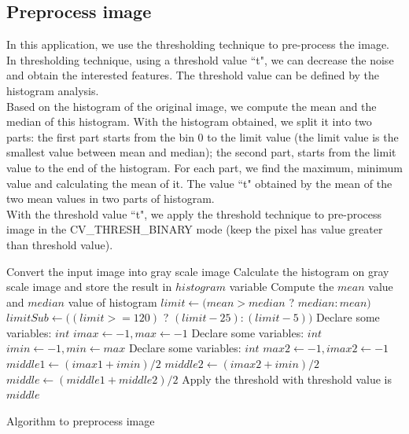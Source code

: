 \subsection{Preprocess image}
In this application, we use the thresholding technique to pre-process the image. In thresholding technique, using a threshold value ``t", we can decrease the noise and obtain the interested features. The threshold value can be defined by the histogram analysis.\\[0.2cm]
Based on the histogram of the original image, we compute the mean and the median of this histogram. With the histogram obtained, we split it into two parts: the first part starts from the bin 0 to the limit value (the limit value is the smallest value between mean and median); the second part, starts from the limit value to the end of the histogram. For each part, we find the maximum, minimum value and calculating the mean of it. The value ``t" obtained by the mean of the two mean values in two parts of histogram.\\
With the threshold value ``t", we apply the threshold technique to pre-process image in the CV\_THRESH\_BINARY mode (keep the pixel has value greater than threshold value).\\
\IncMargin{1em}
\begin{algorithm}[H]
\Indm 
{}
\Indp
Convert the input image into gray scale image\;
Calculate the histogram on gray scale image and store the result in $histogram$ variable \;
Compute the $mean$ value and $median$ value of histogram\;
$limit \leftarrow (mean > median$ ? $median : mean)$\;
$limitSub \leftarrow ((limit >= 120)$ ? $(limit - 25) : (limit - 5))$\;
Declare some variables: $int$ $imax \leftarrow -1, max \leftarrow -1$\;
Declare some variables: $int$ $imin \leftarrow -1, min \leftarrow max$\;
Declare some variables: $int$ $max2 \leftarrow -1, imax2 \leftarrow -1$\;
$middle1 \leftarrow (imax1 + imin)/2$ \;
$middle2 \leftarrow (imax2 + imin)/2$ \;
$middle \leftarrow (middle1 + middle2)/2$ \;
Apply the threshold with threshold value is $middle$\;
\caption{Algorithm to preprocess image}
\end{algorithm}\DecMargin{1em}

